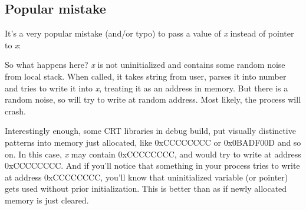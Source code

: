 \subsection{Popular mistake}

It's a very popular mistake (and/or typo) to pass a value of \emph{x} instead of pointer to \emph{x}:



So what happens here?
\emph{x} is not uninitialized and contains some random noise from local stack.
When \scanf called, it takes string from user, parses it into number and tries to write it into \emph{x}, treating
it as an address in memory.
But there is a random noise, so \scanf will try to write at random address.
Most likely, the process will crash.

Interestingly enough, some \ac{CRT} libraries in debug build, put visually distinctive patterns
into memory just allocated, like 0xCCCCCCCC or 0x0BADF00D and so on.
In this case, \emph{x} may contain 0xCCCCCCCC, and \scanf would try to write at address 0xCCCCCCCC.
And if you'll notice that something in your process tries to write at address 0xCCCCCCCC, you'll know
that uninitialized variable (or pointer) gets used without prior initialization.
This is better than as if newly allocated memory is just cleared.

